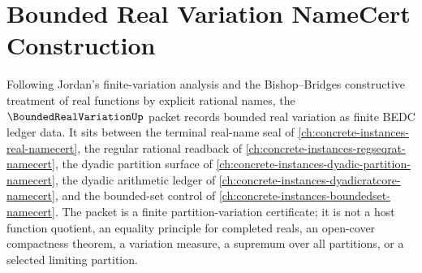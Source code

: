 \chapter{Bounded Real Variation NameCert Construction}
\label{ch:concrete-instances-bounded-real-variation-namecert}

Following Jordan's finite-variation analysis and the Bishop--Bridges constructive treatment of real functions by explicit rational names, the $\BoundedRealVariationUp$ packet records bounded real variation as finite BEDC ledger data. It sits between the terminal real-name seal of \autoref{ch:concrete-instances-real-namecert}, the regular rational readback of \autoref{ch:concrete-instances-regseqrat-namecert}, the dyadic partition surface of \autoref{ch:concrete-instances-dyadic-partition-namecert}, the dyadic arithmetic ledger of \autoref{ch:concrete-instances-dyadicratcore-namecert}, and the bounded-set control of \autoref{ch:concrete-instances-boundedset-namecert}. The packet is a finite partition-variation certificate; it is not a host function quotient, an equality principle for completed reals, an open-cover compactness theorem, a variation measure, a supremum over all partitions, or a selected limiting partition.

